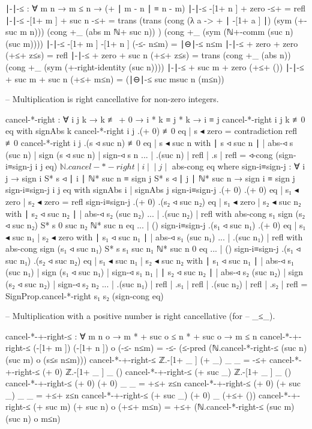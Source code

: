 \documentclass[11pt,a4paper]{article}
\begin{document}
\begin{code}
∣-∣-≤ : ∀ {m n} → m ≤ n → (+ ∣ m - n ∣ ≡ n - m)
∣-∣-≤ { -[1+ n ]} {+ zero} -≤+ = refl
∣-∣-≤ { -[1+ m ]} {+ suc n} -≤+ = trans (trans (cong (λ a -> +
    ∣ -[1+ a ] ∣) (sym (+-suc m n))) (cong +_ (abs {m ℕ+ suc n})) )
    (cong +_ (sym (ℕ+-comm (suc n) (suc m))))
∣-∣-≤ { -[1+ m ]} { -[1+ n ] } (-≤- n≤m) = ∣⊖∣-≤ n≤m
∣-∣-≤ {+ zero} {+ zero} (+≤+ z≤s) = refl
∣-∣-≤ {+ zero} {+ suc n} (+≤+ z≤s) = trans (cong +_ (abs {n}))
    (cong +_ (sym (+-right-identity (suc n))))
∣-∣-≤ {+ suc m} {+ zero} (+≤+ ())
∣-∣-≤ {+ suc m} {+ suc n} (+≤+ m≤n) = (∣⊖∣-≤ {suc m}{suc n} (m≤n))

-- Multiplication is right cancellative for non-zero integers.

cancel-*-right : ∀ i j k →
                 k ≢ + 0 → i * k ≡ j * k → i ≡ j
cancel-*-right i j k            ≢0 eq with signAbs k
cancel-*-right i j .(+ 0)       ≢0 eq | s ◂ zero  = contradiction refl ≢0
cancel-*-right i j .(s ◃ suc n) ≢0 eq | s ◂ suc n
  with ∣ s ◃ suc n ∣ | abs-◃ s (suc n) | sign (s ◃ suc n) | sign-◃ s n
...  | .(suc n)      | refl            | .s               | refl =
  ◃-cong (sign-i≡sign-j i j eq) $
         ℕ.cancel-*-right ∣ i ∣ ∣ j ∣ $ abs-cong eq
  where
  sign-i≡sign-j : ∀ i j →
                  sign i S* s ◃ ∣ i ∣ ℕ* suc n ≡
                  sign j S* s ◃ ∣ j ∣ ℕ* suc n →
                  sign i ≡ sign j
  sign-i≡sign-j i              j              eq with signAbs i | signAbs j
  sign-i≡sign-j .(+ 0)         .(+ 0)         eq | s₁ ◂ zero   | s₂ ◂ zero   = refl
  sign-i≡sign-j .(+ 0)         .(s₂ ◃ suc n₂) eq | s₁ ◂ zero   | s₂ ◂ suc n₂
    with ∣ s₂ ◃ suc n₂ ∣ | abs-◃ s₂ (suc n₂)
  ... | .(suc n₂) | refl
    with abs-cong {s₁} {sign (s₂ ◃ suc n₂) S* s} {0} {suc n₂ ℕ* suc n} eq
  ...   | ()
  sign-i≡sign-j .(s₁ ◃ suc n₁) .(+ 0)         eq | s₁ ◂ suc n₁ | s₂ ◂ zero
    with ∣ s₁ ◃ suc n₁ ∣ | abs-◃ s₁ (suc n₁)
  ... | .(suc n₁) | refl
    with abs-cong {sign (s₁ ◃ suc n₁) S* s} {s₁} {suc n₁ ℕ* suc n} {0} eq
  ...   | ()
  sign-i≡sign-j .(s₁ ◃ suc n₁) .(s₂ ◃ suc n₂) eq | s₁ ◂ suc n₁ | s₂ ◂ suc n₂
    with ∣ s₁ ◃ suc n₁ ∣ | abs-◃ s₁ (suc n₁)
       | sign (s₁ ◃ suc n₁) | sign-◃ s₁ n₁
       | ∣ s₂ ◃ suc n₂ ∣ | abs-◃ s₂ (suc n₂)
       | sign (s₂ ◃ suc n₂) | sign-◃ s₂ n₂
  ... | .(suc n₁) | refl | .s₁ | refl | .(suc n₂) | refl | .s₂ | refl =
    SignProp.cancel-*-right s₁ s₂ (sign-cong eq)

-- Multiplication with a positive number is right cancellative (for
-- _≤_).

cancel-*-+-right-≤ : ∀ m n o → m * + suc o ≤ n * + suc o → m ≤ n
cancel-*-+-right-≤ (-[1+ m ]) (-[1+ n ]) o (-≤- n≤m) =
  -≤- (≤-pred (ℕ.cancel-*-right-≤ (suc n) (suc m) o (s≤s n≤m)))
cancel-*-+-right-≤ ℤ.-[1+ _ ] (+ _)      _ _         = -≤+
cancel-*-+-right-≤ (+ 0)      ℤ.-[1+ _ ] _ ()
cancel-*-+-right-≤ (+ suc _)  ℤ.-[1+ _ ] _ ()
cancel-*-+-right-≤ (+ 0)      (+ 0)      _ _         = +≤+ z≤n
cancel-*-+-right-≤ (+ 0)      (+ suc _)  _ _         = +≤+ z≤n
cancel-*-+-right-≤ (+ suc _)  (+ 0)      _ (+≤+ ())
cancel-*-+-right-≤ (+ suc m)  (+ suc n)  o (+≤+ m≤n) =
  +≤+ (ℕ.cancel-*-right-≤ (suc m) (suc n) o m≤n)


\end{code}
\end{document}
